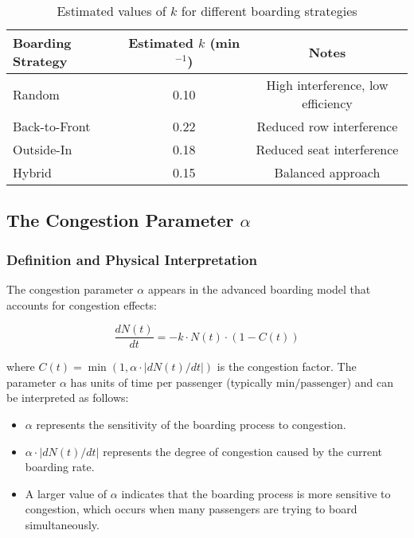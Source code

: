 \documentclass[12pt,a4paper]{article}
\begin{document}
\begin{table}[H]
\centering
\begin{tabular}{|l|c|c|}
\hline
\textbf{Boarding Strategy} & \textbf{Estimated $k$ (min$^{-1}$)} & \textbf{Notes} \\ \hline
Random & 0.10 & High interference, low efficiency \\ \hline
Back-to-Front & 0.22 & Reduced row interference \\ \hline
Outside-In & 0.18 & Reduced seat interference \\ \hline
Hybrid & 0.15 & Balanced approach \\ \hline
\end{tabular}
\caption{Estimated values of $k$ for different boarding strategies}
\label{tab:k_values}
\end{table}

\subsection{The Congestion Parameter $\alpha$}

\subsubsection{Definition and Physical Interpretation}

The congestion parameter $\alpha$ appears in the advanced boarding model that accounts for congestion effects:

\begin{equation}
\frac{dN(t)}{dt} = -k \cdot N(t) \cdot (1 - C(t))
\end{equation}

where $C(t) = \min(1, \alpha \cdot |dN(t)/dt|)$ is the congestion factor. The parameter $\alpha$ has units of time per passenger (typically $\text{min/passenger}$) and can be interpreted as follows:

\begin{itemize}
    \item $\alpha$ represents the sensitivity of the boarding process to congestion.
    \item $\alpha \cdot |dN(t)/dt|$ represents the degree of congestion caused by the current boarding rate.
    \item A larger value of $\alpha$ indicates that the boarding process is more sensitive to congestion, which occurs when many passengers are trying to board simultaneously.
\end{itemize}
\end{document}
